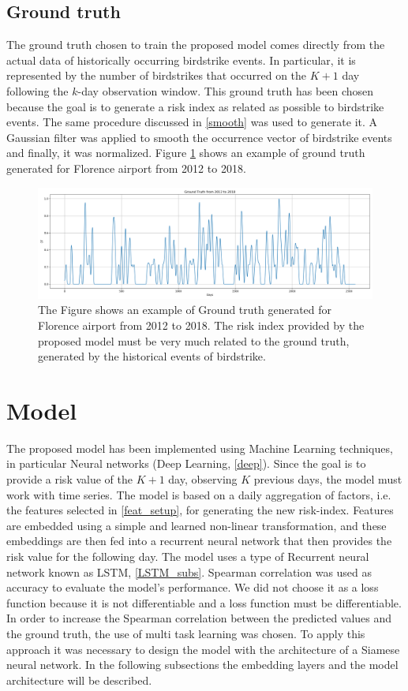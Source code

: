 \subsection{Ground truth}
The ground truth chosen to train the proposed model comes directly from the actual data of historically occurring birdstrike events.
In particular, it is represented by the number of birdstrikes that occurred on the $K+1$ day following the $k$-day observation window.
This ground truth has been chosen because the goal is to generate a risk index as related as possible to birdstrike events.
The same procedure discussed in \ref{smooth} was used to generate it. A Gaussian filter was applied to smooth the occurrence vector of birdstrike events and finally, it was normalized.
Figure \ref{GT_fig} shows an example of ground truth generated for Florence airport from 2012 to 2018.

\begin{figure}
	\centering
	\includegraphics[width=13.2cm]{img/GT.png}
	\caption{The Figure shows an example of Ground truth generated for Florence airport from 2012 to 2018. The risk index provided by the proposed model must be very much related to the ground truth, generated by the historical events of birdstrike.}
	\label{GT_fig}
\end{figure}

\section{Model}\label{model_section}
The proposed model has been implemented using Machine Learning techniques, in particular Neural networks (Deep Learning, \ref{deep}).
Since the goal is to provide a risk value of the $K+1$ day, observing $K$ previous days, the model must work with time series. The model is based on a daily aggregation of factors, i.e. the features selected in \ref{feat_setup}, for generating the new risk-index. 
Features are embedded using a simple and learned non-linear transformation, and these embeddings are then fed into a recurrent neural network that then provides the risk value for the following day. The model uses a type of Recurrent neural network known as LSTM, \ref{LSTM_subs}.
Spearman correlation was used as accuracy to evaluate the model's performance. We did not choose it as a loss function because it is not differentiable and a loss function must be differentiable.
In order to increase the Spearman correlation between the predicted values and the ground truth, the use of multi task learning \cite{1997multitask} was chosen. To apply this approach it was necessary to design the model with the architecture of a Siamese neural network.
In the following subsections the embedding layers and the model architecture will be described.

